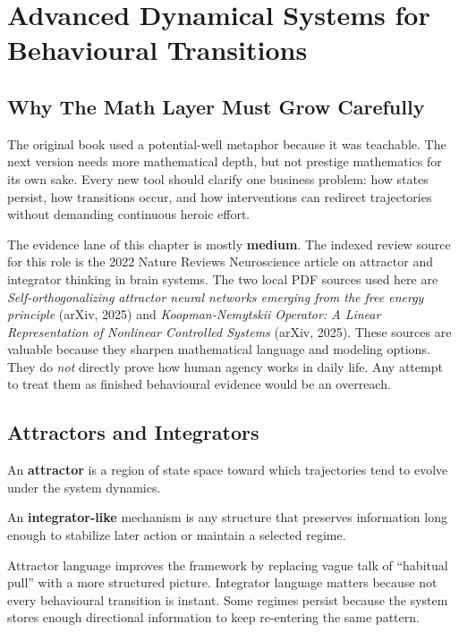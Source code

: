 \chapter{Advanced Dynamical Systems for Behavioural Transitions}
\label{ch:advanced-dynamics}

\section{Why The Math Layer Must Grow Carefully}

The original book used a potential-well metaphor because it was teachable. The
next version needs more mathematical depth, but not prestige mathematics for
its own sake. Every new tool should clarify one business problem: how states
persist, how transitions occur, and how interventions can redirect trajectories
without demanding continuous heroic effort.

The evidence lane of this chapter is mostly \textbf{medium}. The indexed review
source for this role is the 2022 Nature Reviews Neuroscience article on
attractor and integrator thinking in brain systems. The two local PDF sources
used here are \emph{Self-orthogonalizing attractor neural networks emerging
from the free energy principle} (arXiv, 2025) and \emph{Koopman-Nemytskii
Operator: A Linear Representation of Nonlinear Controlled Systems} (arXiv,
2025). These sources are valuable because they sharpen mathematical language
and modeling options. They do \emph{not} directly prove how human agency works
in daily life. Any attempt to treat them as finished behavioural evidence would
be an overreach.

\section{Attractors and Integrators}

\begin{definition}[Attractor]
An \textbf{attractor} is a region of state space toward which trajectories tend
to evolve under the system dynamics.
\end{definition}

\begin{definition}
An \textbf{integrator-like} mechanism is any structure that preserves
information long enough to stabilize later action or maintain a selected regime.
\end{definition}

\begin{discussion}
Attractor language improves the framework by replacing vague talk of
``habitual pull'' with a more structured picture. Integrator language matters
because not every behavioural transition is instant. Some regimes persist
because the system stores enough directional information to keep re-entering
the same pattern.
\end{discussion}

